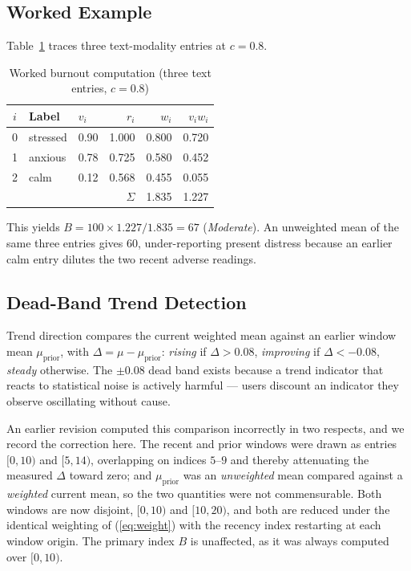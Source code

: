 \documentclass[conference]{IEEEtran}
\begin{document}
\subsection{Worked Example}
Table~\ref{tab:worked} traces three text-modality entries at $c = 0.8$.

\begin{table}[htbp]
\caption{Worked burnout computation (three text entries, $c=0.8$)}
\label{tab:worked}
\centering
\begin{tabular}{@{}cllrrr@{}}
\toprule
$i$ & Label & $v_i$ & $r_i$ & $w_i$ & $v_i w_i$ \\
\midrule
0 & stressed & 0.90 & 1.000 & 0.800 & 0.720 \\
1 & anxious  & 0.78 & 0.725 & 0.580 & 0.452 \\
2 & calm     & 0.12 & 0.568 & 0.455 & 0.055 \\
\midrule
\multicolumn{4}{r}{$\Sigma$} & 1.835 & 1.227 \\
\bottomrule
\end{tabular}
\end{table}

This yields $B = 100 \times 1.227 / 1.835 = 67$ (\textit{Moderate}). An
unweighted mean of the same three entries gives $60$, under-reporting present
distress because an earlier calm entry dilutes the two recent adverse
readings.

\subsection{Dead-Band Trend Detection}
Trend direction compares the current weighted mean against an earlier window
mean $\mu_{\text{prior}}$, with $\Delta = \mu - \mu_{\text{prior}}$:
\textit{rising} if $\Delta > 0.08$, \textit{improving} if $\Delta < -0.08$,
\textit{steady} otherwise. The $\pm 0.08$ dead band exists because a trend
indicator that reacts to statistical noise is actively harmful --- users
discount an indicator they observe oscillating without cause.

An earlier revision computed this comparison incorrectly in two respects, and
we record the correction here. The recent and prior windows were drawn as
entries $[0,10)$ and $[5,14)$, overlapping on indices $5$--$9$ and thereby
attenuating the measured $\Delta$ toward zero; and $\mu_{\text{prior}}$ was an
\emph{unweighted} mean compared against a \emph{weighted} current mean, so the
two quantities were not commensurable. Both windows are now disjoint,
$[0,10)$ and $[10,20)$, and both are reduced under the identical weighting of
(\ref{eq:weight}) with the recency index restarting at each window origin. The
primary index $B$ is unaffected, as it was always computed over $[0,10)$.
\end{document}
